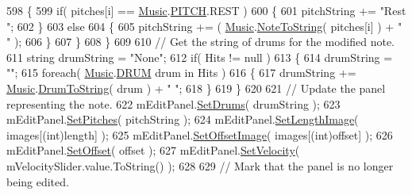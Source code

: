 \begin{DoxyCodeInclude}
598                     \{
599                         \textcolor{keywordflow}{if}( pitches[i] == \hyperlink{class_music}{Music}.\hyperlink{group___music_enums_ga508f69b199ea518f935486c990edac1d}{PITCH}.REST )
600                         \{
601                             pitchString += \textcolor{stringliteral}{"Rest "};
602                         \}
603                         \textcolor{keywordflow}{else}
604                         \{
605                             pitchString += ( \hyperlink{class_music}{Music}.\hyperlink{group___music_stat_func_ga85a22c905d56d4c5f4e62159bfecee8c}{NoteToString}( pitches[i] ) + \textcolor{stringliteral}{" "} );
606                         \}
607                     \}
608                 \}
609 
610                 \textcolor{comment}{// Get the string of drums for the modified note.}
611                 \textcolor{keywordtype}{string} drumString = \textcolor{stringliteral}{"None"};
612                 \textcolor{keywordflow}{if}( Hits != null )
613                 \{
614                     drumString = \textcolor{stringliteral}{""};
615                     \textcolor{keywordflow}{foreach}( \hyperlink{class_music}{Music}.\hyperlink{group___music_enums_gade475b4382c7066d1af13e7c13c029b6}{DRUM} drum in Hits )
616                     \{
617                         drumString += \hyperlink{class_music}{Music}.\hyperlink{group___music_stat_func_gaf5f64ebe9a7e036e07f283e41f26d22b}{DrumToString}( drum ) + \textcolor{stringliteral}{" "};
618                     \}
619                 \}
620 
621                 \textcolor{comment}{// Update the panel representing the note.}
622                 mEditPanel.\hyperlink{group___s_c___n_d_p_unity_gae14b5564be204df7699b95186d83f69f}{SetDrums}( drumString );
623                 mEditPanel.\hyperlink{group___s_c___n_d_p_unity_gad9bf776f0c51cf6170faccf9fc4ac7e0}{SetPitches}( pitchString );
624                 mEditPanel.\hyperlink{group___s_c___n_d_p_unity_ga1a1c4b8111463ec3e134d17fe5064a54}{SetLengthImage}( images[(\textcolor{keywordtype}{int})length] );
625                 mEditPanel.\hyperlink{group___s_c___n_d_p_unity_gaa0a517d1359cd1ed109a130bd52763f1}{SetOffsetImage}( images[(\textcolor{keywordtype}{int})offset] );
626                 mEditPanel.\hyperlink{group___s_c___n_d_p_unity_ga8ff7588e8c3f59a03842feaff92f97e9}{SetOffset}( offset );
627                 mEditPanel.\hyperlink{group___s_c___n_d_p_unity_ga8a2fef715606caa884c7b490850fb9b7}{SetVelocity}( mVelocitySlider.value.ToString() );
628 
629                 \textcolor{comment}{// Mark that the panel is no longer being edited.}

\end{DoxyCodeInclude}
